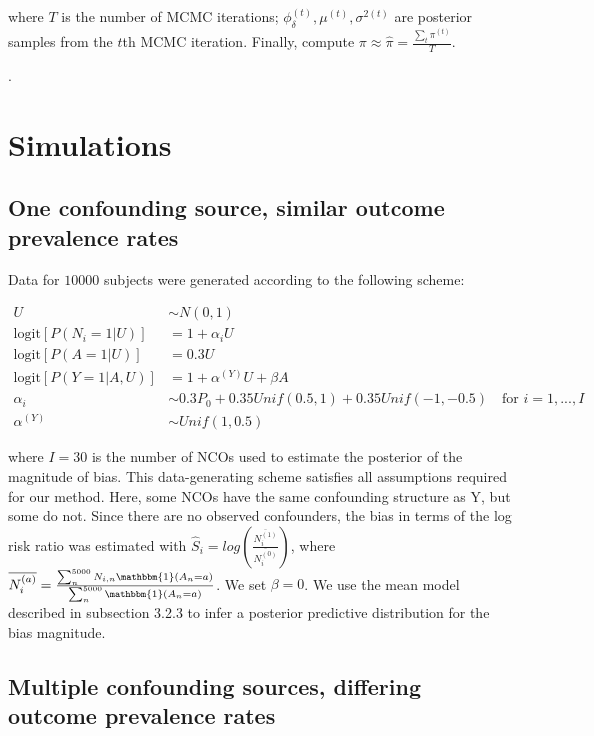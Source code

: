 where $T$ is the number of MCMC iterations; $\phi_\delta^{(t)}, \mu^{(t)}, \sigma^{2(t)}$ are posterior samples from the $t$th MCMC iteration. Finally, compute $\pi \approx \hat{\pi} = \frac{\sum_t \pi^{(t)}}{T}$.

.

\section{Simulations}
\label{sec:nco_sim}

\subsection{One confounding source, similar outcome prevalence rates}

Data for $10000$ subjects were generated according to the following scheme:

\begin{align*}
    U &\sim N(0, 1)\\
    \text{logit}[P(N_{i}=1|U)] &= 1 + \alpha_{i} U \\
    \text{logit}[P(A=1|U)] &= 0.3 U \\
    \text{logit}[P(Y=1|A, U)] &= 1 + \alpha^{(Y)} U + \beta A \\
    \alpha_{i} &\sim 0.3P_0 + 0.35 Unif(0.5, 1) + 0.35 Unif(-1, -0.5) \quad \text{for } i=1,...,I \\
    \alpha^{(Y)} &\sim Unif(1, 0.5)
\end{align*}

\noindent where $I=30$ is the number of NCOs used to estimate the posterior of the magnitude of bias. This data-generating scheme satisfies all assumptions required for our method. Here, some NCOs have the same confounding structure as Y, but some do not. Since there are no observed confounders, the bias in terms of the log risk ratio was estimated with $\widehat{S}_{i} = log(\frac{\overline{N_i^{(1)}}}{\overline{N_i^{(0)}}})$, where $\overline{N_i^{(a)}} = \frac{\sum_n^{5000} N_{i,n} \mathbbm{1}(A_n=a)}{\sum_n^{5000} \mathbbm{1}(A_n=a)}$. We set $\beta=0$. We use the mean model described in subsection 3.2.3 to infer a posterior predictive distribution for the bias magnitude.


\subsection{Multiple confounding sources, differing outcome prevalence rates}

